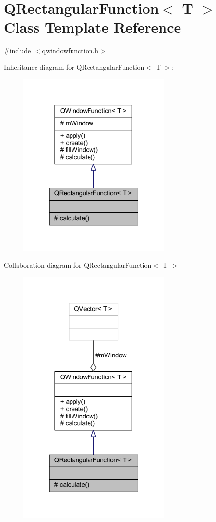 \hypertarget{a00062}{\section{Q\+Rectangular\+Function$<$ T $>$ Class Template Reference}
\label{a00062}
}


{\ttfamily \#include $<$qwindowfunction.\+h$>$}



Inheritance diagram for Q\+Rectangular\+Function$<$ T $>$\+:
\nopagebreak
\begin{figure}[H]
\begin{center}
\leavevmode
\includegraphics[width=217pt]{d8/deb/a00545}
\end{center}
\end{figure}


Collaboration diagram for Q\+Rectangular\+Function$<$ T $>$\+:
\nopagebreak
\begin{figure}[H]
\begin{center}
\leavevmode
\includegraphics[width=217pt]{dc/d2b/a00546}
\end{center}
\end{figure}
